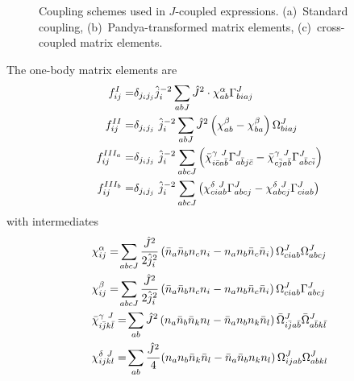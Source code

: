 \documentclass[11pt]{article}
\newcommand{\MyRomanNum}[1]{%
\ifcase#1\or I\or II\or III\or IV\or V\or VI\or VII\or VIII\or IX\or X\else #1\fi}
\begin{document}
\begin{figure}[ht]
\centering
{}
\caption{\label{fig_coupling}Coupling schemes used in $J$-coupled expressions. (a)~Standard coupling, (b)~Pandya-transformed matrix elements, (c)~cross-coupled matrix elements.}
\end{figure}

The one-body matrix elements are
\begin{subequations}\label{doubleCommutator_1b_Jcoupled_factorized}
\begin{align} \allowdisplaybreaks[4] 
 f^\MyRomanNum{1}_{ij}  =& \delta_{ j_i j_j} \hat{{j}}_{i}^{-2}  \sum_{ab J}  \hat{{J}}^{2}  \cdot  \chi^{\alpha}_{ab}  \Gamma^{J}_{biaj}      \\
 f^{\MyRomanNum{2}}_{ij}  =& \delta_{ j_i j_j} ~\hat j_i^{-2}  \sum_{ab J}  \hat J^2 \left(\chi^{\beta}_{ab}  -   \chi^{\beta}_{ba}  \right) \Omega^{J}_{biaj}   \\
 f^{\MyRomanNum{3}_a}_{ij}  =&  \delta_{ j_i j_j}~\hat j_i^{-2} \sum_{abc J} \left(  \bar \chi^{\gamma~J}_{i \bar c a \bar b} \Gamma^{J}_{a \bar b j \bar c} - \bar \chi^{\gamma~J}_{c \bar j a \bar b} \Gamma^{J}_{a \bar b c \bar i} \right)  \\
 f^{\MyRomanNum{3}_b}_{ij}  =& \delta_{ j_i j_j} ~\hat j_i^{-2} \sum_{abc J} \left(\chi^{\delta~J}_{ciab}  \Gamma^{J}_{abcj} - \chi^{\delta~J}_{abcj} \Gamma^{J}_{ciab} \right)
\end{align}
\end{subequations}
with intermediates
\begin{subequations}\label{Jcoupled_chi_1b}
\begin{align} \allowdisplaybreaks[4] 
 &\chi^{\alpha}_{ij} = \!  \sum_{abc J} \frac{\hat{J}^2}{2\hat{j}_{i}^{2}}   \left( \bar{n}_a  \bar{n}_b  {n}_c {n}_i  -  {n}_a  {n}_b  \bar{n}_c  \bar{n}_i \right) %
  \Omega^{J}_{ciab} \Omega^{J}_{abcj} \\
&\chi^\beta_{ij} =\! \sum_{abc J} \frac{\hat{J}^2}{2\hat{j}_{i}^{2}}   \left( \bar{n}_a  \bar{n}_b  {n}_c {n}_i  -  {n}_a  {n}_b  \bar{n}_c  \bar{n}_i \right) 
 \Omega^{J}_{ciab} \Gamma^{J}_{abcj} \\
&\bar{\chi}^{\gamma ~ J}_{i \bar j k \bar l} = \!  \sum_{ab}\hat J^2 \left( {n}_a \bar{n}_b \bar{n}_k  {n}_l    -  \bar{n}_a  {n}_b {n}_k  \bar{n}_l  \right)   \bar{\Omega}^{J}_{i \bar j  a \bar b} \bar{\Omega}^{J}_{a \bar b  k \bar l} \\
&\chi^{\delta~J}_{ijkl} =\!  \sum_{ab}\frac{\hat J^2}{4}\! \left(   {n}_a  {n}_b \bar{n}_k \bar{n}_l -    \bar{n}_a \bar{n}_b {n}_k {n}_l   \right) \Omega^{ J}_{ijab} \Omega^{ J}_{abkl}
\end{align}
\end{subequations}
\end{document}
